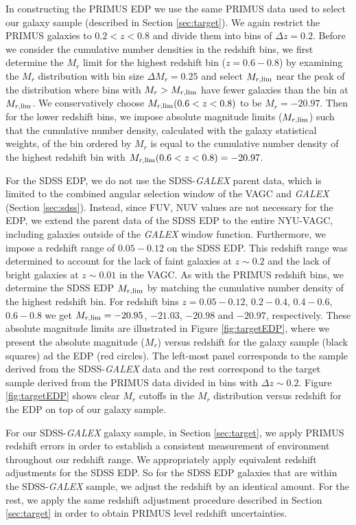 \documentclass{emulateapj}
\begin{document}
In constructing the PRIMUS EDP we use the same PRIMUS data used to select our galaxy sample (described in Section \ref{sec:target}). We again restrict the PRIMUS galaxies to $0.2 < z < 0.8$ and divide them into bins of $\Delta z = 0.2$. Before we consider the cumulative number densities in the redshift bins, we first determine the $M_r$ limit for the highest redshift bin ($z = 0.6-0.8$) by examining the $M_{r}$ distribution with bin size $\Delta M_{r} = 0.25$ and select $M_{r,\rm{lim}}$ near the peak of the distribution where bins with $M_{r} > M_{r,\rm{lim}}$ have fewer galaxies than the bin at $M_{r, \rm{lim}}$. We conservatively choose $M_{r, \rm{lim}}(0.6 < z < 0.8)$ to be $M_{r} = -20.97$. Then for the lower redshift bins, we impose absolute magnitude limits ($M_{r,\rm{lim}}$) such that the cumulative number density, calculated with the galaxy statistical weights, of the bin ordered by $M_{r}$ is equal to the cumulative number density of the highest redshift bin with $M_{r, \rm{lim}}(0.6 < z < 0.8) = -20.97$. 

For the SDSS EDP, we do not use the SDSS-{\em GALEX} parent data,
which is limited to the combined angular selection window of the
VAGC and {\em GALEX} (Section \ref{sec:sdss}). Instead, since FUV, NUV
values are not necessary for the EDP, we extend the parent data of the
SDSS EDP to the entire NYU-VAGC, including galaxies outside of the
{\em GALEX} window function. Furthermore, we impose a redshift range
of $0.05-0.12$ on the SDSS EDP. This redshift range was determined to
account for the lack of faint galaxies at $z \sim 0.2$ and the lack of
bright galaxies at $z \sim 0.01$ in the VAGC. As with the PRIMUS
redshift bins, we determine the SDSS EDP $M_{r, \rm{lim}}$ by matching
the cumulative number density of the highest redshift bin. For
redshift bins $z = 0.05-0.12$, $0.2-0.4$, $0.4-0.6$, $0.6-0.8$ we get
$M_{r,\rm{lim}} = -20.95$, $-21.03$, $-20.98$ and $-20.97$,
respectively. These absolute magnitude limits are illustrated in
Figure \ref{fig:targetEDP}, where we present the absolute magnitude ($M_{r}$) versus redshift for the galaxy sample (black squares) ad the EDP (red circles). 
The left-most panel corresponds to the sample derived from the SDSS-{\em GALEX} data and the rest correspond to the target sample derived from the PRIMUS data divided in bins with $\Delta z \sim 0.2$. 
Figure \ref{fig:targetEDP} shows clear $M_r$ cutoffs in the
$M_{r}$ distribution versus redshift for the EDP on top
of our galaxy sample.

For our SDSS-{\em GALEX} galaxy sample, in Section \ref{sec:target}, we apply PRIMUS redshift errors in order to establish a consistent measurement of environment throughout our redshift range. We appropriately apply equivalent redshift adjustments for the SDSS EDP. So for the SDSS EDP galaxies that are within the SDSS-{\em GALEX} sample, we adjust the redshift by an identical amount. For the rest, we apply the same redshift adjustment procedure described in Section \ref{sec:target} in order to obtain PRIMUS level redshift uncertainties. 
\end{document}
